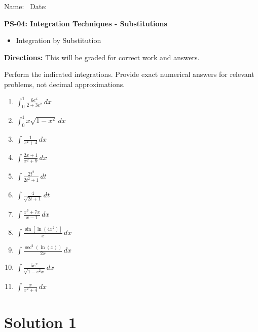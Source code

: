 \documentclass{article}
\begin{document}
\flushleft
Name:\ \makebox[3in]{\hrulefill} \hspace{1in} Date:\ \makebox[1in]{\hrulefill} 
\begin{center}
    \textbf{PS-04: Integration Techniques - Substitutions}   
\end{center}

\begin{center}
\begin{tcolorbox}[colback=white, colframe=black, colbacktitle=white, coltitle=black, title=\textbf{Due: Wednesday, 2026 November 4},boxrule=1pt,width=12cm]
    \begin{itemize}
        \item Integration by Substitution
    \end{itemize}
\end{tcolorbox}
\end{center}

\textbf{Directions:} This will be graded for correct work and answers.

Perform the indicated integrations. Provide exact numerical answers for relevant problems, not decimal approximations.
\begin{enumerate}
  \item $\int_0^1 \frac{6e^x}{2+3e^x} \, dx$
  \item $\int_0^1 x\sqrt{1-x^2} \, dx$
  \item $\int \frac{1}{x^2+4} \, dx$
  \item $\int \frac{2x+1}{x^2+9} \, dx$
  \item $\int \frac{2t^2}{2t^2+1} \, dt$
  \item $\int \frac{4}{\sqrt{2t+1}} \, dt$
  \item $\int \frac{x^3+7x}{x-1} \, dx$
  \item $\int \frac{\sin\left[\ln(4x^2)\right]}{x} \, dx$
  \item $\int \frac{\sec^2\left(\ln\left(x\right)\right)}{2x} \, dx$
  \item $\int \frac{5e^x}{\sqrt{1-e^2x}} \, dx$
  \item $\int \frac{x}{x^2+4} \, dx$
\end{enumerate}
\newpage
\section*{Solution 1}
\end{document}
